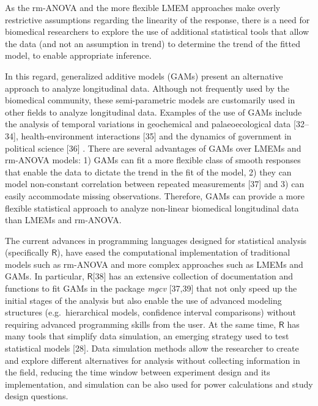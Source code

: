 \documentclass[
]{article}
\begin{document}
As the rm-ANOVA and the more flexible LMEM approaches make overly restrictive assumptions regarding the linearity of the response, there is a need for biomedical researchers to explore the use of additional statistical tools that allow the data (and not an assumption in trend) to determine the trend of the fitted model, to enable appropriate inference.

In this regard, generalized additive models (GAMs) present an alternative approach to analyze longitudinal data. Although not frequently used by the biomedical community, these semi-parametric models are customarily used in other fields to analyze longitudinal data. Examples of the use of GAMs include the analysis of temporal variations in geochemical and palaeoecological data {[}32--34{]}, health-environment interactions {[}35{]} and the dynamics of government in political science {[}36{]} . There are several advantages of GAMs over LMEMs and rm-ANOVA models: 1) GAMs can fit a more flexible class of smooth responses that enable the data to dictate the trend in the fit of the model, 2) they can model non-constant correlation between repeated measurements {[}37{]} and 3) can easily accommodate missing observations. Therefore, GAMs can provide a more flexible statistical approach to analyze non-linear biomedical longitudinal data than LMEMs and rm-ANOVA.

The current advances in programming languages designed for statistical analysis (specifically \(\textsf{R}\)), have eased the computational implementation of traditional models such as rm-ANOVA and more complex approaches such as LMEMs and GAMs. In particular, \(\textsf{R}\){[}38{]} has an extensive collection of documentation and functions to fit GAMs in the package \emph{mgcv} {[}37,39{]} that not only speed up the initial stages of the analysis but also enable the use of advanced modeling structures (e.g.~hierarchical models, confidence interval comparisons) without requiring advanced programming skills from the user. At the same time, \(\textsf{R}\) has many tools that simplify data simulation, an emerging strategy used to test statistical models {[}28{]}. Data simulation methods allow the researcher to create and explore different alternatives for analysis without collecting information in the field, reducing the time window between experiment design and its implementation, and simulation can be also used for power calculations and study design questions.
\end{document}
